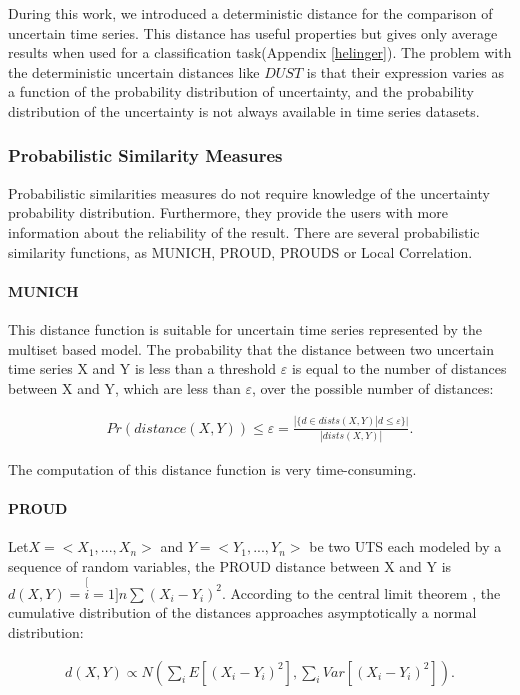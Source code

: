 During this work, we introduced a deterministic distance for the comparison of uncertain time series. This distance has useful properties but gives only average results when used for a classification task(Appendix \ref{helinger}). The problem with the deterministic uncertain distances like $DUST$ is that their expression varies as a function of the probability distribution of uncertainty,  and the probability distribution of the uncertainty is not always available in time series datasets.


\subsubsection{Probabilistic Similarity Measures}
Probabilistic similarities measures do not require knowledge of the uncertainty probability distribution. Furthermore, they provide the users with more information about the reliability of the result. There are several probabilistic similarity functions, as MUNICH, PROUD, PROUDS or Local Correlation. 
\paragraph{MUNICH}
\cite{assfalg2009probabilistic}
This distance function is suitable for uncertain time series represented by the multiset based model. The probability that the distance between two uncertain time series X and Y is less than a threshold $\varepsilon$ is equal to the number of distances between X and Y, which are less than $\varepsilon$, over the possible number of distances:

\begin{eqnarray}
Pr(distance(X,Y))\leq\varepsilon=\frac{|\{d\in
dists(X,Y)|d\leq\varepsilon\}|}{|dists(X,Y)|}.
\end{eqnarray}

The computation of this distance function is very time-consuming.

\paragraph{PROUD}
\cite{yeh2009proud} Let$X=<X_{1},...,X_{n}>$ and $Y=<Y_{1},...,Y_{n}>$ be two UTS each modeled  by a sequence of random variables, the PROUD distance between X and Y is $d(X,Y)=\stackrel[i=1]{n}{\sum}(X_{i}-Y_{i})^{2}.$
According to the central limit theorem \cite{hoffmann1976law}, the cumulative distribution of the distances approaches asymptotically a normal distribution:

\begin{eqnarray}
d(X,Y)\propto
N(\underset{i}{\sum}E[(X_{i}-Y_{i})^{2}],\underset{i}{\sum}Var[(X_{i}-Y_{i})^{2}]).
\end{eqnarray}


